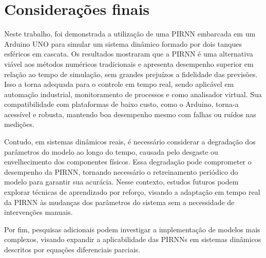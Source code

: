 \section{Considerações finais}

Neste trabalho, foi demonstrada a utilização de uma PIRNN embarcada em um Arduino UNO para simular um sistema dinâmico formado por dois tanques esféricos em cascata. Os resultados mostraram que a PIRNN é uma alternativa viável aos métodos numéricos tradicionais e apresenta desempenho superior em relação ao tempo de simulação, sem grandes prejuízos a fidelidade das previsões. Isso a torna adequada para o controle em tempo real, sendo aplicável em automação industrial, monitoramento de processos e como analisador virtual. Sua compatibilidade com plataformas de baixo custo, como o Arduino, torna-a acessível e robusta, mantendo boa desempenho mesmo com falhas ou ruídos nas medições.

Contudo, em sistemas dinâmicos reais, é necessário considerar a degradação dos parâmetros do modelo ao longo do tempo, causada pelo desgaste ou envelhecimento dos componentes físicos. Essa degradação pode comprometer o desempenho da PIRNN, tornando necessário o retreinamento periódico do modelo para garantir sua acurácia. Nesse contexto, estudos futuros podem explorar técnicas de aprendizado por reforço, visando a adaptação em tempo real da PIRNN às mudanças dos parâmetros do sistema sem a necessidade de intervenções manuais.

Por fim, pesquisas adicionais podem investigar a implementação de modelos mais complexos, visando expandir a aplicabilidade das PIRNNs em sistemas dinâmicos descritos por equações diferenciais parciais.
